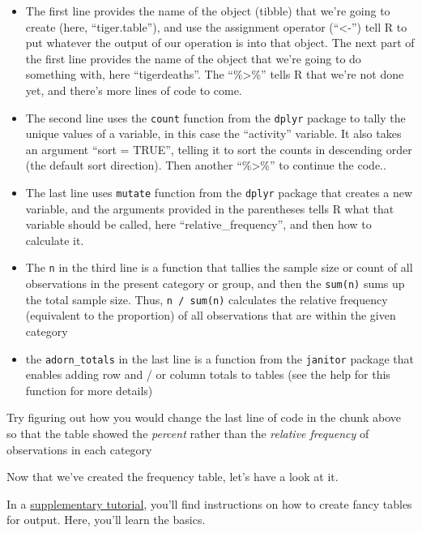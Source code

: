 \documentclass[
]{book}
\providecommand{\tightlist}{%
  \setlength{\itemsep}{0pt}\setlength{\parskip}{0pt}}
\begin{document}
\begin{itemize}
\tightlist
\item
  The first line provides the name of the object (tibble) that we're going to create (here, ``tiger.table''), and use the assignment operator (``\textless-'') tell R to put whatever the output of our operation is into that object. The next part of the first line provides the name of the object that we're going to do something with, here ``tigerdeaths''. The ``\%\textgreater\%'' tells R that we're not done yet, and there's more lines of code to come.
\item
  The second line uses the \texttt{count} function from the \texttt{dplyr} package to tally the unique values of a variable, in this case the ``activity'' variable. It also takes an argument ``sort = TRUE'', telling it to sort the counts in descending order (the default sort direction). Then another ``\%\textgreater\%'' to continue the code..
\item
  The last line uses \texttt{mutate} function from the \texttt{dplyr} package that creates a new variable, and the arguments provided in the parentheses tells R what that variable should be called, here ``relative\_frequency'', and then how to calculate it.
\item
  The \texttt{n} in the third line is a function that tallies the sample size or count of all observations in the present category or group, and then the \texttt{sum(n)} sums up the total sample size. Thus, \texttt{n\ /\ sum(n)} calculates the relative frequency (equivalent to the proportion) of all observations that are within the given category\\
\item
  the \texttt{adorn\_totals} in the last line is a function from the \texttt{janitor} package that enables adding row and / or column totals to tables (see the help for this function for more details)
\end{itemize}

Try figuring out how you would change the last line of code in the chunk above so that the table showed the \emph{percent} rather than the \emph{relative frequency} of observations in each category

Now that we've created the frequency table, let's have a look at it.

In a \href{https://ubco-biology.github.io/BIOL202/creating-tables-in-r-markdown.html}{supplementary tutorial}, you'll find instructions on how to create fancy tables for output. Here, you'll learn the basics.
\end{document}

